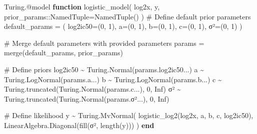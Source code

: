 \documentclass[
]{scrartcl}
\newenvironment{Shaded}{\begin{snugshade}}{\end{snugshade}}
\newcommand{\BuiltInTok}[1]{\textcolor[rgb]{0.00,0.23,0.31}{#1}}
\newcommand{\CommentTok}[1]{\textcolor[rgb]{0.37,0.37,0.37}{#1}}
\newcommand{\ConstantTok}[1]{\textcolor[rgb]{0.56,0.35,0.01}{#1}}
\newcommand{\DataTypeTok}[1]{\textcolor[rgb]{0.68,0.00,0.00}{#1}}
\newcommand{\FloatTok}[1]{\textcolor[rgb]{0.68,0.00,0.00}{#1}}
\newcommand{\FunctionTok}[1]{\textcolor[rgb]{0.28,0.35,0.67}{#1}}
\newcommand{\KeywordTok}[1]{\textcolor[rgb]{0.00,0.23,0.31}{\textbf{#1}}}
\newcommand{\NormalTok}[1]{\textcolor[rgb]{0.00,0.23,0.31}{#1}}
\newcommand{\OperatorTok}[1]{\textcolor[rgb]{0.37,0.37,0.37}{#1}}
\newcommand{\PreprocessorTok}[1]{\textcolor[rgb]{0.68,0.00,0.00}{#1}}
\begin{document}
\begin{Shaded}
\begin{Highlighting}[]
\NormalTok{Turing.}\PreprocessorTok{@model} \KeywordTok{function} \FunctionTok{logistic\_model}\NormalTok{(}
\NormalTok{    log2x, y, prior\_params}\OperatorTok{::}\DataTypeTok{NamedTuple}\NormalTok{=}\FunctionTok{NamedTuple}\NormalTok{()}
\NormalTok{)}
    \CommentTok{\# Define default prior parameters}
\NormalTok{    default\_params }\OperatorTok{=}\NormalTok{ (}
\NormalTok{        log2ic50}\OperatorTok{=}\NormalTok{(}\FloatTok{0}\NormalTok{, }\FloatTok{1}\NormalTok{),}
\NormalTok{        a}\OperatorTok{=}\NormalTok{(}\FloatTok{0}\NormalTok{, }\FloatTok{1}\NormalTok{),}
\NormalTok{        b}\OperatorTok{=}\NormalTok{(}\FloatTok{0}\NormalTok{, }\FloatTok{1}\NormalTok{),}
\NormalTok{        c}\OperatorTok{=}\NormalTok{(}\FloatTok{0}\NormalTok{, }\FloatTok{1}\NormalTok{),}
\NormalTok{        σ²}\OperatorTok{=}\NormalTok{(}\FloatTok{0}\NormalTok{, }\FloatTok{1}\NormalTok{)}
\NormalTok{    )}

    \CommentTok{\# Merge default parameters with provided parameters}
\NormalTok{    params }\OperatorTok{=} \FunctionTok{merge}\NormalTok{(default\_params, prior\_params)}

    \CommentTok{\# Define priors}
\NormalTok{    log2ic50 }\OperatorTok{\textasciitilde{}}\NormalTok{ Turing.}\FunctionTok{Normal}\NormalTok{(params.log2ic50}\OperatorTok{...}\NormalTok{)}
\NormalTok{    a }\OperatorTok{\textasciitilde{}}\NormalTok{ Turing.}\FunctionTok{LogNormal}\NormalTok{(params.a}\OperatorTok{...}\NormalTok{)}
\NormalTok{    b }\OperatorTok{\textasciitilde{}}\NormalTok{ Turing.}\FunctionTok{LogNormal}\NormalTok{(params.b}\OperatorTok{...}\NormalTok{)}
\NormalTok{    c }\OperatorTok{\textasciitilde{}}\NormalTok{ Turing.}\FunctionTok{truncated}\NormalTok{(Turing.}\FunctionTok{Normal}\NormalTok{(params.c}\OperatorTok{...}\NormalTok{), }\FloatTok{0}\NormalTok{, }\ConstantTok{Inf}\NormalTok{)}
\NormalTok{    σ² }\OperatorTok{\textasciitilde{}}\NormalTok{ Turing.}\FunctionTok{truncated}\NormalTok{(Turing.}\FunctionTok{Normal}\NormalTok{(params.σ²}\OperatorTok{...}\NormalTok{), }\FloatTok{0}\NormalTok{, }\ConstantTok{Inf}\NormalTok{)}

    \CommentTok{\# Define likelihood}
\NormalTok{    y }\OperatorTok{\textasciitilde{}}\NormalTok{ Turing.}\FunctionTok{MvNormal}\NormalTok{(}
        \FunctionTok{logistic\_log2}\NormalTok{(log2x, a, b, c, log2ic50),}
        \BuiltInTok{LinearAlgebra}\NormalTok{.}\FunctionTok{Diagonal}\NormalTok{(}\FunctionTok{fill}\NormalTok{(σ², }\FunctionTok{length}\NormalTok{(y)))}
\NormalTok{    )}
\KeywordTok{end}
\end{Highlighting}
\end{Shaded}
\end{document}
